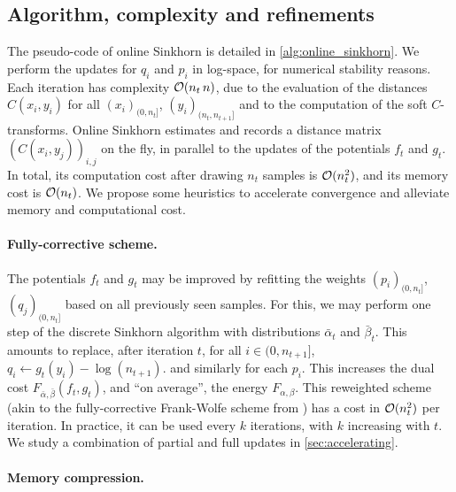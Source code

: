 \subsection{Algorithm, complexity and refinements}\label{sec:alg}

The pseudo-code of online Sinkhorn is detailed in \autoref{alg:online_sinkhorn}.
We perform the updates for $q_i$ and $p_i$ in log-space, for numerical stability reasons.
Each iteration has complexity $\mathcal{O}(n_t\,n)$, due to the evaluation of the
distances $C(x_i, y_i)$ for all $(x_i)_{(0, n_t]}$, $(y_i)_{(n_t, n_{t+1}]}$
and to the computation of the
soft $C$-transforms. Online Sinkhorn estimates and records a distance matrix
$(C(x_i,y_j))_{i,j}$ on the fly, in parallel to the updates of the potentials
$f_t$ and $g_t$. In total, its computation cost after drawing $n_t$ samples is
$\mathcal{O}(n_t^2)$, and its memory cost is $\mathcal{O}(n_t)$.
%
We propose some heuristics to accelerate convergence and alleviate memory and computational cost.


\paragraph{Fully-corrective scheme.} 

The potentials $f_t$ and $g_t$ may be improved by refitting the weights
$(p_i)_{(0, n_t]}$, $(q_j)_{(0, n_t]}$ based on all previously seen samples.  For this, we 
may perform one step of the discrete Sinkhorn algorithm with
distributions $\bar \alpha_t$ and $\bar \beta_t$.
This amounts to replace, after iteration $t$, for all $i \in (0, n_{t+1}]$,
$q_i \gets g_t(y_i) - \log(n_{t+1})$. and similarly for each $p_i$. This increases the dual cost
$F_{ \bar \alpha, \bar \beta}(f_t, g_t)$, and ``on average'', the energy
$F_{\alpha, \beta}$. This reweighted scheme (akin to the fully-corrective
Frank-Wolfe scheme from \citet{lacoste2015global}) has a cost in $\mathcal{O}(n_t^2)$
per iteration. In practice, it can be used every $k$ iterations, with $k$
increasing with $t$. We study a combination of partial and full updates in
\autoref{sec:accelerating}.

\paragraph{Memory compression.} 

